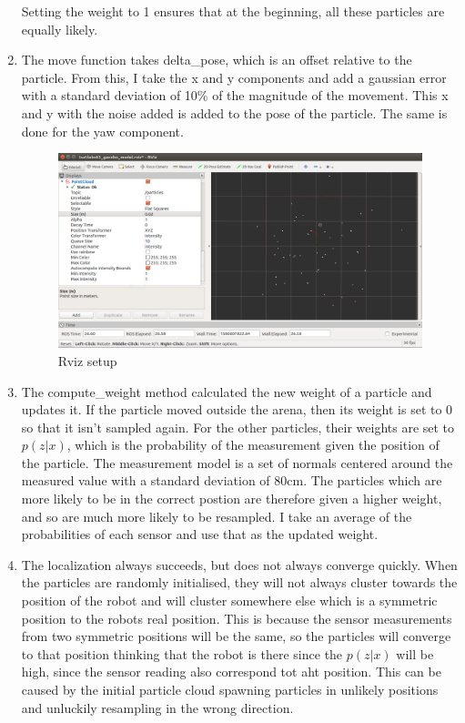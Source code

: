 \documentclass[12pt,a4paper]{article}
\begin{document}
\begin{enumerate}[label=(\alph*)]
	Setting the weight to 1 ensures that at the beginning, all these particles are equally likely.

	\item The move function takes delta\_pose, which is an offset relative to the particle. From this, I take the x and y components and add a gaussian error with a standard deviation of 10\% of the magnitude of the movement. This x and y with the noise added is added to the pose of the particle. The same is done for the yaw component.

	\begin{figure}[h!]
		\centering
		\includegraphics[width=\textwidth]{fig/3c.png}
		\caption{Rviz setup}
		\label{fig:rviz}
	\end{figure}

	\item The compute\_weight method calculated the new weight of a particle and updates it. If the particle moved outside the arena, then its weight is set to 0 so that it isn't sampled again. For the other particles, their weights are set to $ p(z|x) $, which is the probability of the measurement given the position of the particle. The measurement model is a set of normals centered around the measured value with a standard deviation of 80cm. The particles which are more likely to be in the correct postion are therefore given a higher weight, and so are much more likely to be resampled. I take an average of the probabilities of each sensor and use that as the updated weight.

	\item The localization always succeeds, but does not always converge quickly. When the particles are randomly initialised, they will not always cluster towards the position of the robot and will cluster somewhere else which is a symmetric position to the robots real position. This is because the sensor measurements from two symmetric positions will be the same, so the particles will converge to that position thinking that the robot is there since the $p(z|x)$ will be high, since the sensor reading also correspond tot aht position. This can be caused by the initial particle cloud spawning particles in unlikely positions and unluckily resampling in the wrong direction.


\end{enumerate}
\end{document}
